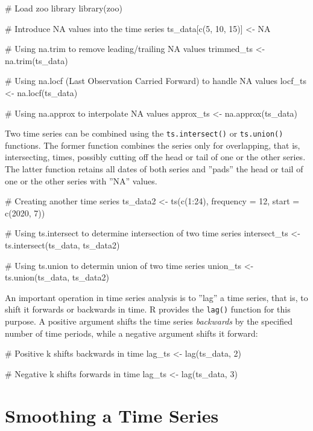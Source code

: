 \begin{withcode}
\begin{Rcode}
# Load zoo library
library(zoo)

# Introduce NA values into the time series
ts_data[c(5, 10, 15)] <- NA

# Using na.trim to remove leading/trailing NA values
trimmed_ts <- na.trim(ts_data)

# Using na.locf (Last Observation Carried Forward) to handle NA values
locf_ts <- na.locf(ts_data)

# Using na.approx to interpolate NA values
approx_ts <- na.approx(ts_data)
\end{Rcode}

Two time series can be combined using the \texttt{ts.intersect()} or \texttt{ts.union()} functions. The former function combines the series only for overlapping, that is, intersecting, times, possibly cutting off the head or tail of one or the other series. The latter function retains all dates of both series and ''pads'' the head or tail of one or the other series with ''NA'' values. 

\begin{Rcode}
# Creating another time series
ts_data2 <- ts(c(1:24), frequency = 12, start = c(2020, 7))

# Using ts.intersect to determine intersection of two time series
intersect_ts <- ts.intersect(ts_data, ts_data2)

# Using ts.union to determin union of two time series
union_ts <- ts.union(ts_data, ts_data2)
\end{Rcode}

An important operation in time series analysis is to ''lag'' a time series, that is, to shift it forwards or backwards in time. R provides the \texttt{lag()} function for this purpose. A positive argument shifts the time series \emph{backwards} by the specified number of time periods, while a negative argument shifts it forward:

\begin{Rcode}
# Positive k shifts backwards in time
lag_ts <- lag(ts_data, 2)

# Negative k shifts forwards in time
lag_ts <- lag(ts_data, 3)
\end{Rcode}
\end{withcode}

\section{Smoothing a Time Series}

